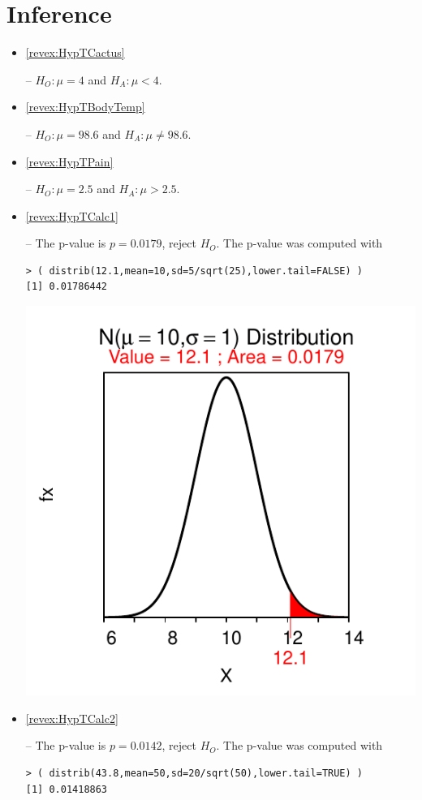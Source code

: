 \documentclass[10pt,openany]{book}\usepackage[]{graphicx}\usepackage[]{color}
\makeatletter
\newenvironment{kframe}{%
 \def\at@end@of@kframe{}%
 \ifinner\ifhmode%
  \def\at@end@of@kframe{\end{minipage}}%
  \begin{minipage}{\columnwidth}%
 \fi\fi%
 \def\FrameCommand##1{\hskip\@totalleftmargin \hskip-\fboxsep
 \colorbox{shadecolor}{##1}\hskip-\fboxsep
     \hskip-\linewidth \hskip-\@totalleftmargin \hskip\columnwidth}%
 \MakeFramed {\advance\hsize-\width
   \@totalleftmargin\z@ \linewidth\hsize
   \@setminipage}}%
 {\par\unskip\endMakeFramed%
 \at@end@of@kframe}
\newenvironment{knitrout}{}{} %
\makeatother
\begin{document}
\section*{Inference}
\begin{itemize}
  \item \hypertarget{ans:HypTCactus}{\ref{revex:HypTCactus}} -- $H_{O}:\mu=4$ and $H_{A}:\mu<4$.
  \item \hypertarget{ans:HypTBodyTemp}{\ref{revex:HypTBodyTemp}} -- $H_{O}:\mu=98.6$ and $H_{A}:\mu\neq98.6$.
  \item \hypertarget{ans:HypTPain}{\ref{revex:HypTPain}} -- $H_{O}:\mu=2.5$ and $H_{A}:\mu>2.5$.

  \item \hypertarget{ans:HypTCalc1}{\ref{revex:HypTCalc1}} -- The p-value is $p=0.0179$, reject $H_{O}$.  The p-value was computed with
\begin{knitrout}
\color{fgcolor}\begin{kframe}
\begin{verbatim}
> ( distrib(12.1,mean=10,sd=5/sqrt(25),lower.tail=FALSE) )
[1] 0.01786442
\end{verbatim}
\end{kframe}

{\centering \includegraphics[width=.4\linewidth]{Figs/HypTCalc1-1} 

}



\end{knitrout}
  \item \hypertarget{ans:HypTCalc2}{\ref{revex:HypTCalc2}} -- The p-value is $p=0.0142$, reject $H_{O}$.  The p-value was computed with
\begin{knitrout}
\color{fgcolor}\begin{kframe}
\begin{verbatim}
> ( distrib(43.8,mean=50,sd=20/sqrt(50),lower.tail=TRUE) )
[1] 0.01418863
\end{verbatim}
\end{kframe}


\end{knitrout}
\end{itemize}
\end{document}
